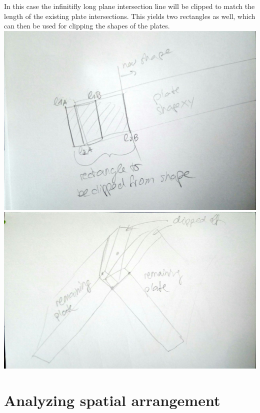 \documentclass[../ClassicThesis.tex]{subfiles}
\begin{document}
In this case the infinitifly long plane intersection line will be clipped to match the length of the existing plate intersections. This yields two rectangles as well, which can then be used for clipping the shapes of the plates.\\
\includegraphics[width=.5\columnwidth, angle=90]{Images/06-1-graph-clippingRectangles.jpg}\\
\includegraphics[width=.5\columnwidth, angle = 90]{Images/06-1-graph-clippingResult.jpg}

\section{Analyzing spatial arrangement}
\end{document}
